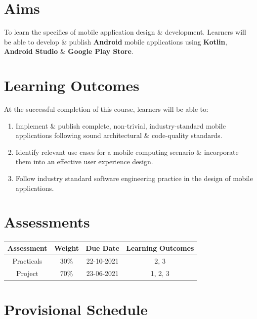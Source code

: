 \documentclass{article}
\begin{document}
\section*{Aims}
To learn the specifics of mobile application design \& development. Learners will be able to develop \& publish \textbf{Android} mobile applications using \textbf{Kotlin}, \textbf{Android Studio} \& \textbf{Google Play Store}.

\section*{Learning Outcomes}
At the successful completion of this course, learners will be able to: 
\begin{enumerate}
	\item Implement \& publish complete, non-trivial, industry-standard mobile applications following sound architectural \& code-quality standards.
	\item Identify relevant use cases for a mobile computing scenario \& incorporate them into an effective user experience design.
	\item Follow industry standard software engineering practice in the design of mobile applications.
\end{enumerate} 

\section*{Assessments}
\renewcommand{\arraystretch}{1.5}	
\begin{tabular}{|c|c|c|c|}
	\hline
	\textbf{Assessment} & \textbf{Weight} & \textbf{Due Date} & \textbf{Learning Outcomes} \\ \hline
	Practicals          & 30\%            & 22-10-2021           & 2, 3                       \\ \hline
	Project             & 70\%            & 23-06-2021        & 1, 2, 3                    \\ \hline
\end{tabular} 

\section*{Provisional Schedule}
\end{document}
